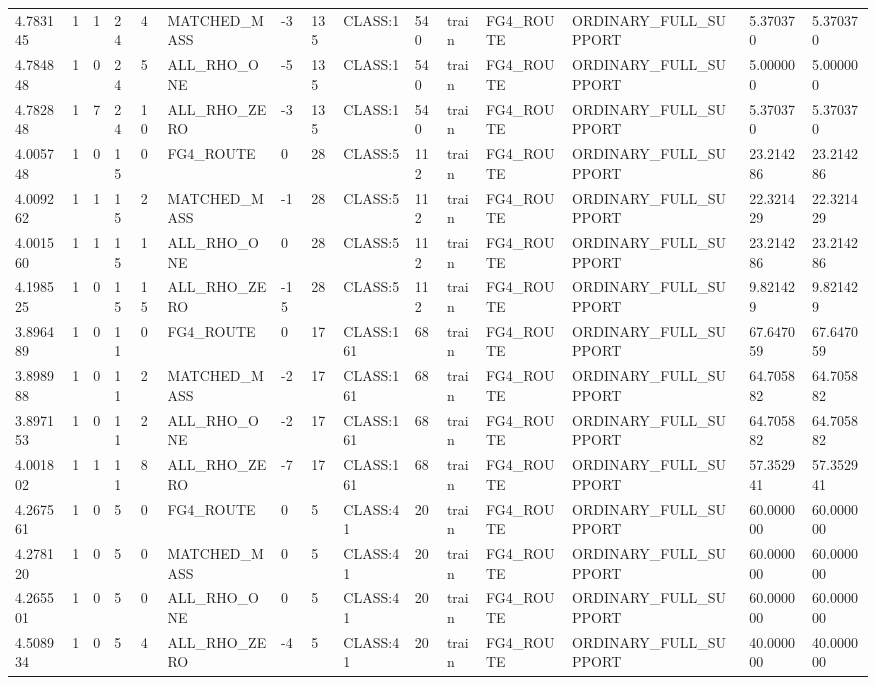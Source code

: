 \begin{tabular}{lllllllllllllll}
4.783145 & 1 & 1 & 24 & 4 & MATCHED\_MASS & -3 & 135 & CLASS:1 & 540 & train & FG4\_ROUTE & ORDINARY\_FULL\_SUPPORT & 5.370370 & 5.370370 \\
4.784848 & 1 & 0 & 24 & 5 & ALL\_RHO\_ONE & -5 & 135 & CLASS:1 & 540 & train & FG4\_ROUTE & ORDINARY\_FULL\_SUPPORT & 5.000000 & 5.000000 \\
4.782848 & 1 & 7 & 24 & 10 & ALL\_RHO\_ZERO & -3 & 135 & CLASS:1 & 540 & train & FG4\_ROUTE & ORDINARY\_FULL\_SUPPORT & 5.370370 & 5.370370 \\
4.005748 & 1 & 0 & 15 & 0 & FG4\_ROUTE & 0 & 28 & CLASS:5 & 112 & train & FG4\_ROUTE & ORDINARY\_FULL\_SUPPORT & 23.214286 & 23.214286 \\
4.009262 & 1 & 1 & 15 & 2 & MATCHED\_MASS & -1 & 28 & CLASS:5 & 112 & train & FG4\_ROUTE & ORDINARY\_FULL\_SUPPORT & 22.321429 & 22.321429 \\
4.001560 & 1 & 1 & 15 & 1 & ALL\_RHO\_ONE & 0 & 28 & CLASS:5 & 112 & train & FG4\_ROUTE & ORDINARY\_FULL\_SUPPORT & 23.214286 & 23.214286 \\
4.198525 & 1 & 0 & 15 & 15 & ALL\_RHO\_ZERO & -15 & 28 & CLASS:5 & 112 & train & FG4\_ROUTE & ORDINARY\_FULL\_SUPPORT & 9.821429 & 9.821429 \\
3.896489 & 1 & 0 & 11 & 0 & FG4\_ROUTE & 0 & 17 & CLASS:161 & 68 & train & FG4\_ROUTE & ORDINARY\_FULL\_SUPPORT & 67.647059 & 67.647059 \\
3.898988 & 1 & 0 & 11 & 2 & MATCHED\_MASS & -2 & 17 & CLASS:161 & 68 & train & FG4\_ROUTE & ORDINARY\_FULL\_SUPPORT & 64.705882 & 64.705882 \\
3.897153 & 1 & 0 & 11 & 2 & ALL\_RHO\_ONE & -2 & 17 & CLASS:161 & 68 & train & FG4\_ROUTE & ORDINARY\_FULL\_SUPPORT & 64.705882 & 64.705882 \\
4.001802 & 1 & 1 & 11 & 8 & ALL\_RHO\_ZERO & -7 & 17 & CLASS:161 & 68 & train & FG4\_ROUTE & ORDINARY\_FULL\_SUPPORT & 57.352941 & 57.352941 \\
4.267561 & 1 & 0 & 5 & 0 & FG4\_ROUTE & 0 & 5 & CLASS:41 & 20 & train & FG4\_ROUTE & ORDINARY\_FULL\_SUPPORT & 60.000000 & 60.000000 \\
4.278120 & 1 & 0 & 5 & 0 & MATCHED\_MASS & 0 & 5 & CLASS:41 & 20 & train & FG4\_ROUTE & ORDINARY\_FULL\_SUPPORT & 60.000000 & 60.000000 \\
4.265501 & 1 & 0 & 5 & 0 & ALL\_RHO\_ONE & 0 & 5 & CLASS:41 & 20 & train & FG4\_ROUTE & ORDINARY\_FULL\_SUPPORT & 60.000000 & 60.000000 \\
4.508934 & 1 & 0 & 5 & 4 & ALL\_RHO\_ZERO & -4 & 5 & CLASS:41 & 20 & train & FG4\_ROUTE & ORDINARY\_FULL\_SUPPORT & 40.000000 & 40.000000 \\

\end{tabular}
